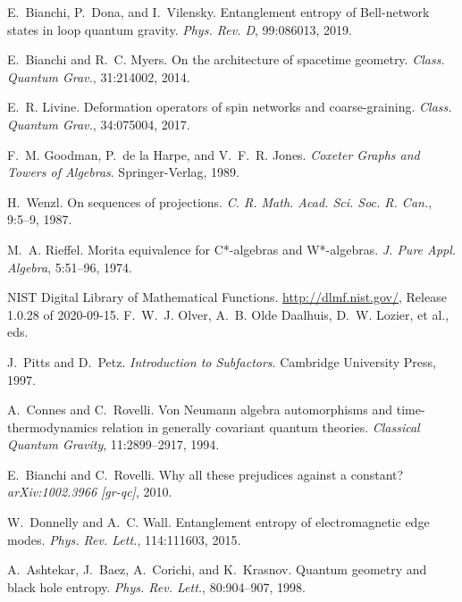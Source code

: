 \documentclass[11pt]{article}
\begin{document}
\begin{thebibliography}{9}
E.~Bianchi, P.~Dona, and I.~Vilensky.
\newblock Entanglement entropy of Bell-network states in loop quantum gravity.
\newblock \emph{Phys. Rev. D}, 99:086013, 2019.

E.~Bianchi and R.~C. Myers.
\newblock On the architecture of spacetime geometry.
\newblock \emph{Class. Quantum Grav.}, 31:214002, 2014.

E.~R. Livine.
\newblock Deformation operators of spin networks and coarse-graining.
\newblock \emph{Class. Quantum Grav.}, 34:075004, 2017.

F.~M. Goodman, P.~de la Harpe, and V.~F.~R. Jones.
\newblock \emph{Coxeter Graphs and Towers of Algebras}.
\newblock Springer-Verlag, 1989.

H.~Wenzl.
\newblock On sequences of projections.
\newblock \emph{C. R. Math. Acad. Sci. Soc. R. Can.}, 9:5--9, 1987.

M.~A. Rieffel.
\newblock Morita equivalence for C*-algebras and W*-algebras.
\newblock \emph{J. Pure Appl. Algebra}, 5:51--96, 1974.

NIST Digital Library of Mathematical Functions.
\newblock \url{http://dlmf.nist.gov/}, Release 1.0.28 of 2020-09-15.
\newblock F.~W.~J. Olver, A.~B. Olde Daalhuis, D.~W. Lozier, et al., eds.

J.~Pitts and D.~Petz.
\newblock \emph{Introduction to Subfactors}.
\newblock Cambridge University Press, 1997.

A.~Connes and C.~Rovelli.
\newblock Von Neumann algebra automorphisms and time-thermodynamics relation in generally covariant quantum theories.
\newblock \emph{Classical Quantum Gravity}, 11:2899--2917, 1994.


E.~Bianchi and C.~Rovelli.
\newblock Why all these prejudices against a constant?
\newblock \emph{arXiv:1002.3966 [gr-qc]}, 2010.

W.~Donnelly and A.~C. Wall.
\newblock Entanglement entropy of electromagnetic edge modes.
\newblock \emph{Phys. Rev. Lett.}, 114:111603, 2015.

A.~Ashtekar, J.~Baez, A.~Corichi, and K.~Krasnov.
\newblock Quantum geometry and black hole entropy.
\newblock \emph{Phys. Rev. Lett.}, 80:904--907, 1998.

\end{thebibliography}
\end{document}
